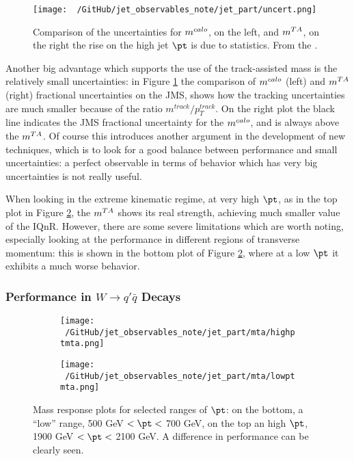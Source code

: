 \begin{figure}[!ht]
  \centering
      \texttt{[image: ~/GitHub/jet\_observables\_note/jet\_part/uncert.png]}
  \caption[Comparison of the uncertainties for $\mcal$ and $\mta$]{Comparison of the uncertainties for $\mcal$, on the left, and $\mta$, on the right the rise on the high jet $\pt$ is due to statistics. From the \cite{art35}.}
  \label{fig:uncert}
\end{figure}

Another big advantage which supports the use of the track-assisted mass is the relatively small uncertainties: in Figure \ref{fig:uncert} the comparison of $\mcal$ (left) and $\mta$ (right) fractional uncertainties on the JMS, shows how the tracking uncertainties are much smaller because of the ratio $m^{track}/p_T^{track}$. On the right plot the black line indicates the JMS fractional uncertainty for the $\mcal$, and is always above the $\mta$. Of course this introduces another argument in the development of new techniques, which is to look for a good balance between performance and small uncertainties: a perfect observable in terms of behavior which has very big uncertainties is not really useful.


When looking in the extreme kinematic regime, at very high $\pt$, as in the top plot in Figure \ref{fig:mta2}, the $\mta$ shows its real strength, achieving much smaller value of the IQnR.
However, there are some severe limitations which are worth noting, especially looking at the performance in different regions of transverse momentum: this is shown in the bottom plot of Figure \ref{fig:mta2}, where at a low $\pt$ it exhibits a much worse behavior.

\subsubsection{Performance in $W \to q'\bar{q}$ Decays}

\begin{figure}
    \centering
    \begin{subfigure}[b]{0.5\textwidth}
	\centering
        \texttt{[image: ~/GitHub/jet\_observables\_note/jet\_part/mta/highptmta.png]}
   
    \end{subfigure}
    \begin{subfigure}[b]{0.5\textwidth}
	\centering
        \texttt{[image: ~/GitHub/jet\_observables\_note/jet\_part/mta/lowptmta.png]}
 
    \end{subfigure}
    \caption[Mass response plots for the $\mta$]{Mass response plots for selected ranges of $\pt$: on the bottom, a ``low'' range, 500 GeV $<\pt<$ 700 GeV, on the top an high $\pt$, 1900 GeV $<\pt<$ 2100 GeV. A difference in performance can be clearly seen.} 
    \label{fig:mta2}
\end{figure}


